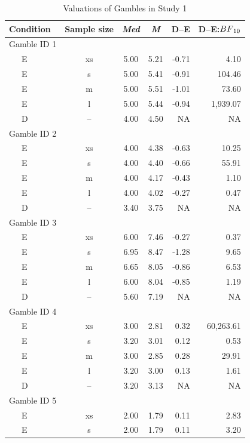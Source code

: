 \documentclass[a4paper, man, floatsintext]{apa6}
\begin{document}
\begin{table}[tbp]
\begin{center}
\begin{threeparttable}
\caption{\label{tab:meansStudy1}Valuations of Gambles in Study 1}
\begin{tabular}{lcccrr}
\toprule
Condition & Sample size & \textit{Med} & \textit{M} & D--E & D--E:$BF\textsubscript{10}$\\
\midrule
Gamble ID 1 &  &  &  &  & \\
\ \ \ E & xs & 5.00 & 5.21 & -0.71 & 4.10\\
\ \ \ E & s & 5.00 & 5.41 & -0.91 & 104.46\\
\ \ \ E & m & 5.00 & 5.51 & -1.01 & 73.60\\
\ \ \ E & l & 5.00 & 5.44 & -0.94 & 1,939.07\\
\ \ \ D & -- & 4.00 & 4.50 & NA & NA\\
Gamble ID 2 &  &  &  &  & \\
\ \ \ E & xs & 4.00 & 4.38 & -0.63 & 10.25\\
\ \ \ E & s & 4.00 & 4.40 & -0.66 & 55.91\\
\ \ \ E & m & 4.00 & 4.17 & -0.43 & 1.10\\
\ \ \ E & l & 4.00 & 4.02 & -0.27 & 0.47\\
\ \ \ D & -- & 3.40 & 3.75 & NA & NA\\
Gamble ID 3 &  &  &  &  & \\
\ \ \ E & xs & 6.00 & 7.46 & -0.27 & 0.37\\
\ \ \ E & s & 6.95 & 8.47 & -1.28 & 9.65\\
\ \ \ E & m & 6.65 & 8.05 & -0.86 & 6.53\\
\ \ \ E & l & 6.00 & 8.04 & -0.85 & 1.19\\
\ \ \ D & -- & 5.60 & 7.19 & NA & NA\\
Gamble ID 4 &  &  &  &  & \\
\ \ \ E & xs & 3.00 & 2.81 & 0.32 & 60,263.61\\
\ \ \ E & s & 3.20 & 3.01 & 0.12 & 0.53\\
\ \ \ E & m & 3.00 & 2.85 & 0.28 & 29.91\\
\ \ \ E & l & 3.20 & 3.00 & 0.13 & 1.61\\
\ \ \ D & -- & 3.20 & 3.13 & NA & NA\\
Gamble ID 5 &  &  &  &  & \\
\ \ \ E & xs & 2.00 & 1.79 & 0.11 & 2.83\\
\ \ \ E & s & 2.00 & 1.79 & 0.11 & 3.20\\

\end{tabular}
\end{threeparttable}
\end{center}
\end{table}
\end{document}
